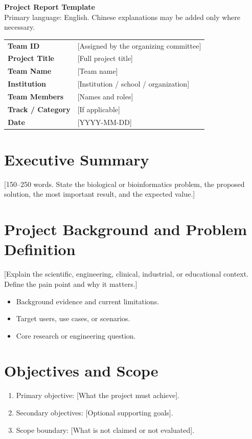 \documentclass[11pt,a4paper]{article}
\newcommand{\placeholder}[1]{[#1]}
\begin{document}
\begin{center}
{\LARGE\bfseries Project Report Template}\\[0.5em]
{\large Primary language: English. Chinese explanations may be added only where necessary.}\\[1.5em]
\end{center}

\begin{tabularx}{\textwidth}{>{\bfseries}p{}X}
\toprule
Team ID & \placeholder{Assigned by the organizing committee}\\
Project Title & \placeholder{Full project title}\\
Team Name & \placeholder{Team name}\\
Institution & \placeholder{Institution / school / organization}\\
Team Members & \placeholder{Names and roles}\\
Track / Category & \placeholder{If applicable}\\
Date & \placeholder{YYYY-MM-DD}\\
\bottomrule
\end{tabularx}

\section*{Executive Summary}
\placeholder{150--250 words. State the biological or bioinformatics problem, the proposed solution, the most important result, and the expected value.}

\section{Project Background and Problem Definition}
\placeholder{Explain the scientific, engineering, clinical, industrial, or educational context. Define the pain point and why it matters.}
\begin{itemize}
  \item Background evidence and current limitations.
  \item Target users, use cases, or scenarios.
  \item Core research or engineering question.
\end{itemize}

\section{Objectives and Scope}
\begin{enumerate}
  \item Primary objective: \placeholder{What the project must achieve}.
  \item Secondary objectives: \placeholder{Optional supporting goals}.
  \item Scope boundary: \placeholder{What is not claimed or not evaluated}.
\end{enumerate}
\end{document}
